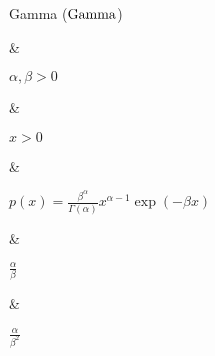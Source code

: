 Gamma ($\operatorname{Gamma}$)

&

$\alpha, \beta > 0$

& 

$x > 0$

&

\(\displaystyle
	p(x) = \frac{\beta^{\alpha}}{\Gamma(\alpha)} x^{\alpha - 1} \exp(-\beta x)
\)

& 

$\frac{\alpha}{\beta}$

&

$\frac{\alpha}{\beta^2}$